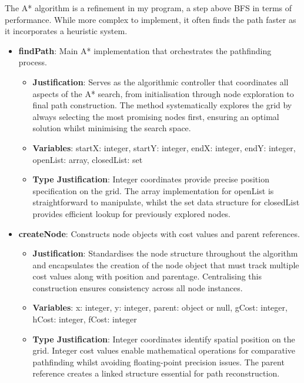 The A* algorithm is a refinement in my program, a step above BFS in terms of performance. While more complex to implement, it often finds the path faster as it incorporates a heuristic system.

\begin{itemize} \item \textbf{findPath}: Main A* implementation that orchestrates the pathfinding process. \begin{itemize} \item \textbf{Justification}: Serves as the algorithmic controller that coordinates all aspects of the A* search, from initialisation through node exploration to final path construction. The method systematically explores the grid by always selecting the most promising nodes first, ensuring an optimal solution whilst minimising the search space. \item \textbf{Variables}: startX: integer, startY: integer, endX: integer, endY: integer, openList: array, closedList: set \item \textbf{Type Justification}: Integer coordinates provide precise position specification on the grid. The array implementation for openList is straightforward to manipulate, whilst the set data structure for closedList provides efficient lookup for previously explored nodes. \end{itemize}

\item \textbf{createNode}: Constructs node objects with cost values and parent references. \begin{itemize} \item \textbf{Justification}: Standardises the node structure throughout the algorithm and encapsulates the creation of the node object that must track multiple cost values along with position and parentage. Centralising this construction ensures consistency across all node instances. \item \textbf{Variables}: x: integer, y: integer, parent: object or null, gCost: integer, hCost: integer, fCost: integer \item \textbf{Type Justification}: Integer coordinates identify spatial position on the grid. Integer cost values enable mathematical operations for comparative pathfinding whilst avoiding floating-point precision issues. The parent reference creates a linked structure essential for path reconstruction. \end{itemize}


\end{itemize}
